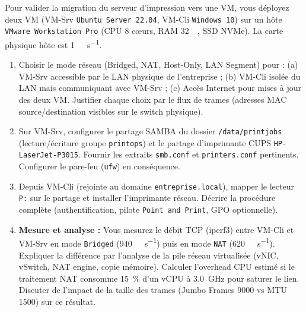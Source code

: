 \documentclass[11pt]{article}
\begin{document}
\begin{exercice}
Pour valider la migration du serveur d'impression vers une VM, vous déployez deux VM (VM-Srv \texttt{Ubuntu Server 22.04}, VM-Cli \texttt{Windows 10}) sur un hôte \texttt{VMware Workstation Pro} (CPU 8 cœurs, RAM \SI{32}{\giga\byte}, SSD NVMe). La carte physique hôte est \SI{1}{\giga\bit\per\second}.

\begin{enumerate}
    \item Choisir le mode réseau (Bridged, NAT, Host-Only, LAN Segment) pour : (a) VM-Srv accessible par le LAN physique de l'entreprise ; (b) VM-Cli isolée du LAN mais communiquant avec VM-Srv ; (c) Accès Internet pour mises à jour des deux VM. Justifier chaque choix par le flux de trames (adresses MAC source/destination visibles sur le switch physique).
    \item Sur VM-Srv, configurer le partage SAMBA du dossier \texttt{/data/printjobs} (lecture/écriture groupe \texttt{printops}) et le partage d'imprimante CUPS \texttt{HP-LaserJet-P3015}. Fournir les extraits \texttt{smb.conf} et \texttt{printers.conf} pertinents. Configurer le pare-feu (\texttt{ufw}) en conséquence.
    \item Depuis VM-Cli (rejointe au domaine \texttt{entreprise.local}), mapper le lecteur \texttt{P:} sur le partage et installer l'imprimante réseau. Décrire la procédure complète (authentification, pilote \texttt{Point and Print}, GPO optionnelle).
    \item \textbf{Mesure et analyse :} Vous mesurez le débit TCP (iperf3) entre VM-Cli et VM-Srv en mode \texttt{Bridged} (\SI{940}{\mega\bit\per\second}) puis en mode \texttt{NAT} (\SI{620}{\mega\bit\per\second}). Expliquer la différence par l'analyse de la pile réseau virtualisée (vNIC, vSwitch, NAT engine, copie mémoire). Calculer l'overhead CPU estimé si le traitement NAT consomme \SI{15}{\percent} d'un vCPU à \SI{3.0}{\giga\hertz} pour saturer le lien. Discuter de l'impact de la taille des trames (Jumbo Frames \SI{9000}{\byte} vs MTU \SI{1500}{\byte}) sur ce résultat.
\end{enumerate}
\end{exercice}
\end{document}
